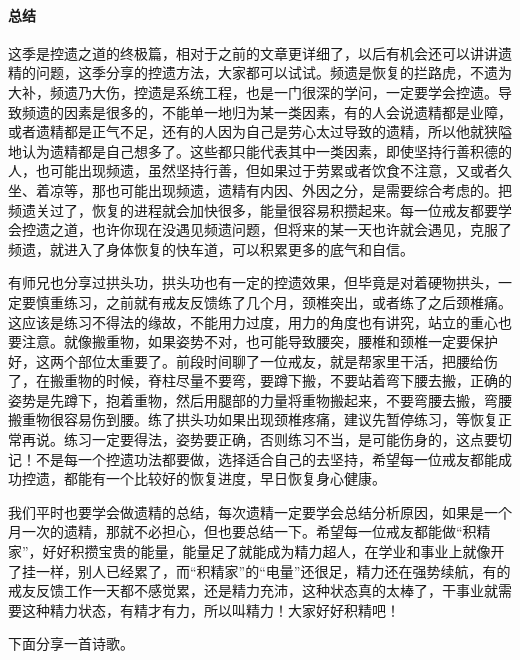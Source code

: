 \paragraph{总结}

这季是控遗之道的终极篇，相对于之前的文章更详细了，以后有机会还可以讲讲遗精的问题，这季分享的控遗方法，大家都可以试试。频遗是恢复的拦路虎，不遗为大补，频遗乃大伤，控遗是系统工程，也是一门很深的学问，一定要学会控遗。导致频遗的因素是很多的，不能单一地归为某一类因素，有的人会说遗精都是业障，或者遗精都是正气不足，还有的人因为自己是劳心太过导致的遗精，所以他就狭隘地认为遗精都是自己想多了。这些都只能代表其中一类因素，即使坚持行善积德的人，也可能出现频遗，虽然坚持行善，但如果过于劳累或者饮食不注意，又或者久坐、着凉等，那也可能出现频遗，遗精有内因、外因之分，是需要综合考虑的。把频遗关过了，恢复的进程就会加快很多，能量很容易积攒起来。每一位戒友都要学会控遗之道，也许你现在没遇见频遗问题，但将来的某一天也许就会遇见，克服了频遗，就进入了身体恢复的快车道，可以积累更多的底气和自信。

有师兄也分享过拱头功，拱头功也有一定的控遗效果，但毕竟是对着硬物拱头，一定要慎重练习，之前就有戒友反馈练了几个月，颈椎突出，或者练了之后颈椎痛。这应该是练习不得法的缘故，不能用力过度，用力的角度也有讲究，站立的重心也要注意。就像搬重物，如果姿势不对，也可能导致腰突，腰椎和颈椎一定要保护好，这两个部位太重要了。前段时间聊了一位戒友，就是帮家里干活，把腰给伤了，在搬重物的时候，脊柱尽量不要弯，要蹲下搬，不要站着弯下腰去搬，正确的姿势是先蹲下，抱着重物，然后用腿部的力量将重物搬起来，不要弯腰去搬，弯腰搬重物很容易伤到腰。练了拱头功如果出现颈椎疼痛，建议先暂停练习，等恢复正常再说。练习一定要得法，姿势要正确，否则练习不当，是可能伤身的，这点要切记！不是每一个控遗功法都要做，选择适合自己的去坚持，希望每一位戒友都能成功控遗，都能有一个比较好的恢复进度，早日恢复身心健康。

我们平时也要学会做遗精的总结，每次遗精一定要学会总结分析原因，如果是一个月一次的遗精，那就不必担心，但也要总结一下。希望每一位戒友都能做“积精家”，好好积攒宝贵的能量，能量足了就能成为精力超人，在学业和事业上就像开了挂一样，别人已经累了，而“积精家”的“电量”还很足，精力还在强势续航，有的戒友反馈工作一天都不感觉累，还是精力充沛，这种状态真的太棒了，干事业就需要这种精力状态，有精才有力，所以叫精力！大家好好积精吧！

下面分享一首诗歌。

